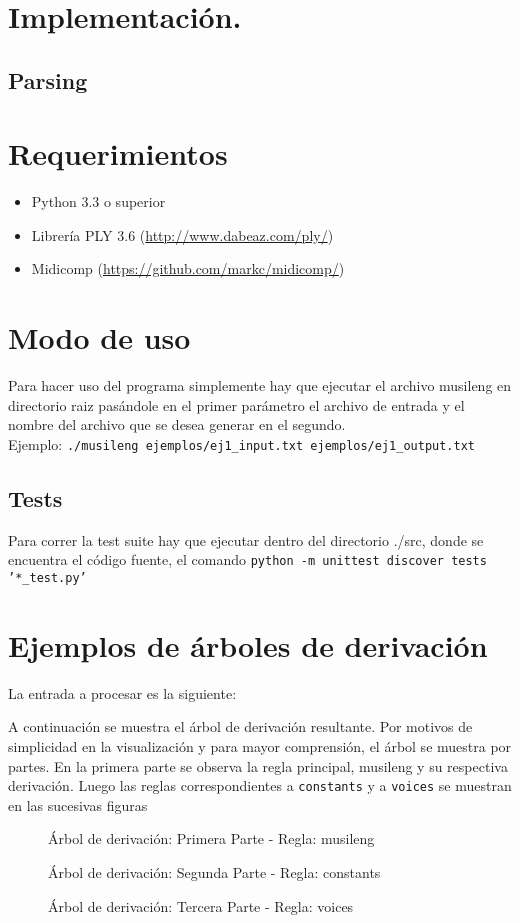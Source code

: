 \documentclass[a4paper,8pt]{article}
\newcommand{\ponerGrafico}[4]
{\begin{figure}[H]
	\centering
	\subfloat{\texttt{[image: \#1]}}
	\caption{#2} \label{fig:#4}
\end{figure}
}
\begin{document}
\section{Implementación.}
\subsection{Parsing}

\section{Requerimientos}
	\begin{itemize}
  		\item Python 3.3 o superior
  		\item Librería PLY 3.6 (\url{http://www.dabeaz.com/ply/})
  		\item Midicomp (\url{https://github.com/markc/midicomp/})
	\end{itemize}

\section{Modo de uso}
Para hacer uso del programa simplemente hay que ejecutar el archivo musileng en directorio raiz pasándole en el primer parámetro el archivo de entrada y el nombre del archivo que se desea generar en el segundo. \\
Ejemplo: \texttt{./musileng ejemplos/ej1\_input.txt ejemplos/ej1\_output.txt }
\subsection{Tests}
Para correr la test suite hay que ejecutar dentro del directorio ./src, donde se encuentra el código fuente, el comando  \texttt{python -m unittest discover tests '*\_test.py'}

\newpage
\section{Ejemplos de árboles de derivación}
La entrada a procesar es la siguiente: 
\begin{small}
  
\end{small}

A continuación se muestra el árbol de derivación resultante. Por motivos de simplicidad en la visualización y para mayor comprensión, el árbol se muestra por partes. En la primera parte se observa la regla principal, musileng y su respectiva derivación. Luego las reglas correspondientes a \texttt{constants} y a \texttt{voices} se muestran en las sucesivas figuras
\ponerGrafico{tree1_musileng.png}{Árbol de derivación: Primera Parte - Regla: musileng}{0.8}{}
\ponerGrafico{tree1_constants.png}{Árbol de derivación: Segunda Parte - Regla: constants}{0.9}{}
\ponerGrafico{tree1_voices.png}{Árbol de derivación: Tercera Parte - Regla: voices}{0.8}{}
\end{document}
